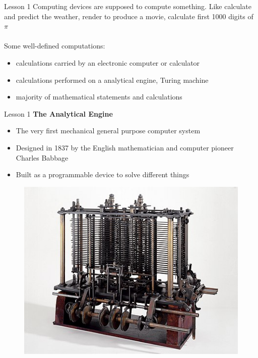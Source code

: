 \documentclass[aspectratio=1610]{beamer}
\begin{document}
\begin{frame}{Lesson 1}{}
\Large
Computing devices are supposed to compute something. Like calculate
and predict the weather, render to produce a movie, calculate first 1000 digits of $\pi$ \\~\\ 
Some well-defined computations:

\begin{itemize}
    \item calculations carried by an electronic computer or calculator
    \item calculations performed on a \alert{analytical engine}, \alert{Turing machine}
    \item majority of mathematical statements and calculations
\end{itemize}

\end{frame}


\begin{frame}{Lesson 1}{}
{\Large\textbf{{The Analytical Engine}}}
\Large
\begin{minipage}{0.64\textwidth}
    \begin{itemize}
      \item The very first mechanical general purpose computer system
      \item Designed in 1837 by the English mathematician and computer pioneer Charles Babbage
      \item Built as a programmable device to solve different things  
    \end{itemize}
  \end{minipage}
\begin{minipage}{0.25\textwidth}
      \begin{figure}
        \includegraphics[scale=0.45]{Images/Babbages_AnalyticalEngine}
      \end{figure}
  \end{minipage}  
\end{frame}
\end{document}
